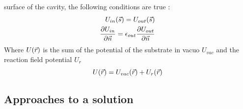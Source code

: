 \documentclass[../master_thesis.tex]{subfiles}
\begin{document}
surface of the cavity, the following conditions are true
\cite{Sorland, Tomasi:1994wt}:
\begin{align}
  \begin{split}
    U_{in}(\vec{s}) = U_{out}(\vec{s})\\
    \frac{\partial U_{in}}{\partial\vec{n}} = \epsilon_{out}\frac{\partial U_{out}}{\partial\vec{n}}
  \end{split}
\end{align}
Where $U(\vec{r})$ is the sum of the potential of the substrate in vacuo
$U_{vac}$ and the reaction field potential $U_r$\cite{Sorland, FossoTande:2013ka}
\begin{equation}\label{eq:Utot}
  U(\vec{r}) = U_{vac}(\vec{r}) + U_r(\vec{r})
\end{equation}

\subsection{Approaches to a solution}\label{approchessolv}
\end{document}
